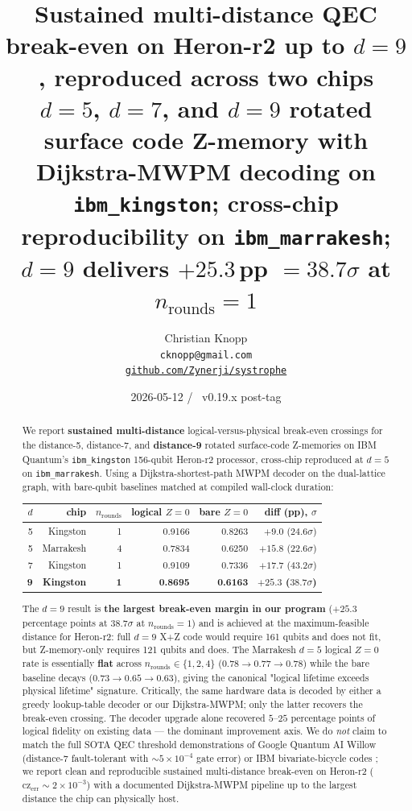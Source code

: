 \documentclass[11pt,letterpaper]{article}
\title{\Large\textbf{Sustained multi-distance QEC break-even on Heron-r2 up to $d = 9$, reproduced across two chips}\\
\large{$d = 5$, $d = 7$, and $d = 9$ rotated surface code Z-memory with Dijkstra-MWPM decoding on \texttt{ibm\_kingston}; cross-chip reproducibility on \texttt{ibm\_marrakesh}; $d = 9$ delivers $+25.3$\,pp $= 38.7\sigma$ at $n_{\mathrm{rounds}} = 1$}}
\author{Christian Knopp \\
  \texttt{cknopp@gmail.com} \\
  \href{https://github.com/Zynerji/systrophe}{\texttt{github.com/Zynerji/systrophe}}}
\date{2026-05-12 \quad / \quad \Systrophe{}\ v0.19.x post-tag}
\begin{document}
\maketitle

\begin{abstract}
We report \textbf{sustained multi-distance} logical-versus-physical break-even crossings for the distance-5, distance-7, and \textbf{distance-9} rotated surface-code Z-memories on IBM Quantum's \texttt{ibm\_kingston} 156-qubit Heron-r2 processor, cross-chip reproduced at $d = 5$ on \texttt{ibm\_marrakesh}. Using a Dijkstra-shortest-path MWPM decoder on the dual-lattice graph, with bare-qubit baselines matched at compiled wall-clock duration:

\begin{center}
\begin{tabular}{rrrrrr}
\toprule
$d$ & chip & $n_{\mathrm{rounds}}$ & logical $Z=0$ & bare $Z=0$ & diff (pp), $\sigma$ \\
\midrule
5 & Kingston  & 1 & 0.9166 & 0.8263 & $+9.0$ ($24.6\sigma$) \\
5 & Marrakesh & 4 & 0.7834 & 0.6250 & $+15.8$ ($22.6\sigma$) \\
7 & Kingston  & 1 & 0.9109 & 0.7336 & $+17.7$ ($43.2\sigma$) \\
\textbf{9} & \textbf{Kingston} & \textbf{1} & \textbf{0.8695} & \textbf{0.6163} & \textbf{$+25.3$ ($38.7\sigma$)} \\
\bottomrule
\end{tabular}
\end{center}

The $d = 9$ result is \textbf{the largest break-even margin in our program} ($+25.3$ percentage points at $38.7\sigma$ at $n_{\mathrm{rounds}} = 1$) and is achieved at the maximum-feasible distance for Heron-r2: full $d = 9$ X+Z code would require 161 qubits and does not fit, but Z-memory-only requires 121 qubits and does. The Marrakesh $d = 5$ logical $Z = 0$ rate is essentially \textbf{flat} across $n_{\mathrm{rounds}} \in \{1, 2, 4\}$ ($0.78 \to 0.77 \to 0.78$) while the bare baseline decays ($0.73 \to 0.65 \to 0.63$), giving the canonical "logical lifetime exceeds physical lifetime" signature. Critically, the same hardware data is decoded by either a greedy lookup-table decoder or our Dijkstra-MWPM; only the latter recovers the break-even crossing. The decoder upgrade alone recovered $5$--$25$ percentage points of logical fidelity on existing data --- the dominant improvement axis. We do \emph{not} claim to match the full SOTA QEC threshold demonstrations of Google Quantum AI Willow (distance-7 fault-tolerant with $\sim 5 \times 10^{-4}$ gate error) \cite{willow} or IBM bivariate-bicycle codes \cite{bb_paper}; we report clean and reproducible sustained multi-distance break-even on Heron-r2 ($\mathrm{cz}_{\mathrm{err}} \sim 2 \times 10^{-3}$) with a documented Dijkstra-MWPM pipeline up to the largest distance the chip can physically host.
\end{abstract}
\end{document}
